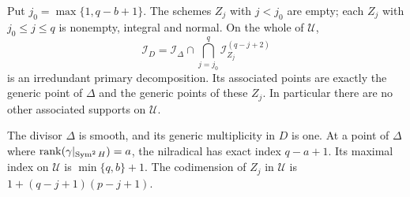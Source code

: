 \begin{theorem}
\label{thm:universal-primary-flag}
Put $j_0=\max\{1,q-b+1\}$. The schemes $Z_j$ with $j<j_0$
are empty; each $Z_j$ with $j_0\le j\le q$ is nonempty, integral
and normal. On the whole of $\mathscr U$,
\begin{equation}\label{eq:universal-primary-flag}
 \mathcal I_D=\mathcal I_\Delta\cap
       \bigcap_{j=j_0}^q\mathcal I_{Z_j}^{(q-j+2)}
\end{equation}
is an irredundant primary decomposition. Its associated points are
exactly the generic point of $\Delta$ and the generic points of
these $Z_j$. In particular there are no other associated supports
on $\mathscr U$.

The divisor $\Delta$ is smooth, and its generic multiplicity in $D$
is one. At a point of $\Delta$ where
$\operatorname{rank}(\gamma|_{\operatorname{Sym}^2H})=a$, the nilradical has exact index
$q-a+1$. Its maximal index on $\mathscr U$ is $\min\{q,b\}+1$.
The codimension of $Z_j$ in $\mathscr U$ is
$1+(q-j+1)(p-j+1)$.
\end{theorem}
